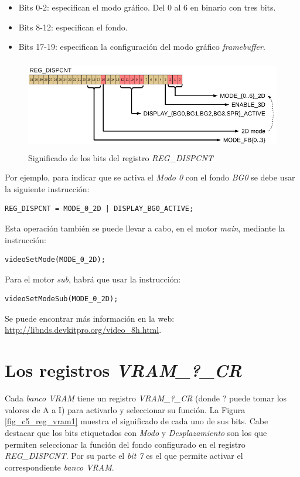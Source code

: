\begin{itemize}
	\item Bits 0-2: especifican el modo gráfico. Del 0 al 6 en binario con tres bits.
	\item Bits 8-12: especifican el fondo.
	\item Bits 17-19: especifican la configuración del modo gráfico \textit{framebuffer}.
\end{itemize}

\begin{figure}[t]
\centering
\includegraphics[height=4cm]{Figuras/C5/c5_reg_dispcnt3.png}
\caption{Significado de los bits del registro \textit{REG\_DISPCNT}}
\label{fig_c5_reg_dispcnt3}
\end{figure}

Por ejemplo, para indicar que se activa el \textit{Modo 0} con el fondo \textit{BG0} se debe usar la siguiente instrucción:

\begin{verbatim}
REG_DISPCNT = MODE_0_2D | DISPLAY_BG0_ACTIVE;
\end{verbatim}

Esta operación también se puede llevar a cabo, en el motor \textit{main}, mediante la instrucción:
\begin{verbatim}
videoSetMode(MODE_0_2D);
\end{verbatim}

Para el motor \textit{sub}, habrá que usar la instrucción:
\begin{verbatim}
videoSetModeSub(MODE_0_2D);
\end{verbatim}

Se puede encontrar más información en la web: \url{http://libnds.devkitpro.org/video_8h.html}. 


\section{Los registros \textit{VRAM\_?\_CR}} 
Cada \textit{banco VRAM} tiene un registro \textit{VRAM\_?\_CR} (donde ? puede tomar los valores de A a I) para activarlo y seleccionar su función. La Figura \ref{fig_c5_reg_vram1} muestra el significado de cada uno de sus bits. Cabe destacar que los bits etiquetados con \textit{Modo} y \textit{Desplazamiento} son los que permiten seleccionar la función del fondo configurado en el registro \textit{REG\_DISPCNT}. Por su parte el \textit{bit 7} es el que permite activar el correspondiente \textit{banco VRAM}.

